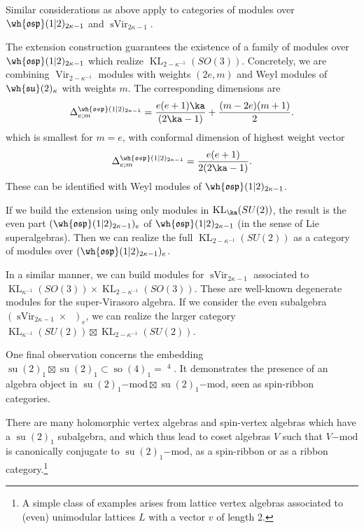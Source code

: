 \documentclass[11pt,reqno]{amsart}
\theoremstyle{plain}
\numberwithin{equation}{section}
\newcommand{\R}{\mathbb{R}}
\DeclareMathOperator{\Vir}{Vir}
\DeclareMathOperator{\sVir}{sVir}
\DeclareMathOperator{\tsu}{su}
\DeclareMathOperator{\tso}{so}
\DeclareMathOperator{\Ff}{\bigwedge_{\R}}
\DeclareMathOperator{\KL}{KL}
\theoremstyle{definition}
\begin{document}
Similar considerations as above apply to categories of modules over
$\wh{\mathfrak{osp}}(1|2)_{2\kappa-1}$ and $\sVir_{2\kappa-1}$. 

The extension construction guarantees the existence of a family of modules over $\wh{\mathfrak{osp}}(1|2)_{2\kappa-1}$ which realize $\KL_{2 - \kappa^{-1}}(SO(3))$. Concretely, we are combining $\Vir_{2 - \kappa^{-1}}$ modules with weights $(2e,m)$ and Weyl modules of $\wh{\mathfrak{su}}(2)_{\kappa}$
with weights $m$. The corresponding dimensions are 
\begin{equation}
\Delta^{\wh{\mathfrak{osp}}(1|2)_{2\kappa-1}}_{e;m} = \frac{e(e+1)\ka}{(2 \ka -1)} + \frac{(m-2e)(m+1)}{2}.
\end{equation}
which is smallest for $m=e$, with conformal dimension of highest weight vector  
\begin{equation}
\Delta^{\wh{\mathfrak{osp}}(1|2)_{2\kappa-1}}_{e;m} = \frac{e(e+1)}{2(2 \ka -1)}.
\end{equation}
These can be identified with Weyl modules of $\wh{\mathfrak{osp}}(1|2)_{2\kappa-1}$.

If we build the extension using only modules in $\KL_\ka(SU(2))$, the
result is the even part $(\wh{\mathfrak{osp}}(1|2)_{2\kappa-1})_e$ of
$\wh{\mathfrak{osp}}(1|2)_{2\kappa-1}$ (in the sense of Lie
superalgebras). Then we can realize the full $\KL_{2 -
  \kappa^{-1}}(SU(2))$ as a category of modules over
$(\wh{\mathfrak{osp}}(1|2)_{2\kappa-1})_e$.

In a similar manner, we can build modules for $\sVir_{2\kappa-1}$
associated to $\KL_{\kappa^{-1}}(SO(3)) \times
\KL_{2-\kappa^{-1}}(SO(3))$. These are well-known degenerate modules
for the super-Virasoro algebra. If we consider the even
subalgebra $(\sVir_{2\kappa-1} \times \Ff)_e$, we can realize the
larger category $\KL_{\kappa^{-1}}(SU(2)) \boxtimes
\KL_{2-\kappa^{-1}}(SU(2))$.

One final observation concerns the embedding $\tsu(2)_1 \boxtimes \tsu(2)_1 \subset \tso(4)_1 =\Ff^4$. It demonstrates the presence of an algebra object in $\tsu(2)_1\mathrm{-mod} \boxtimes \tsu(2)_1\mathrm{-mod}$, seen as spin-ribbon categories. 

There are many holomorphic vertex algebras and spin-vertex algebras
which have a $\tsu(2)_1$ subalgebra, and which thus lead to coset
algebras $V$ such that $V\mathrm{-mod}$ is canonically conjugate to
$\tsu(2)_1\mathrm{-mod}$, as a spin-ribbon or as a ribbon
category.\footnote{A simple class of examples arises from lattice
  vertex algebras associated to (even) unimodular lattices $L$ with a
  vector $v$ of length 2.}
\end{document}

